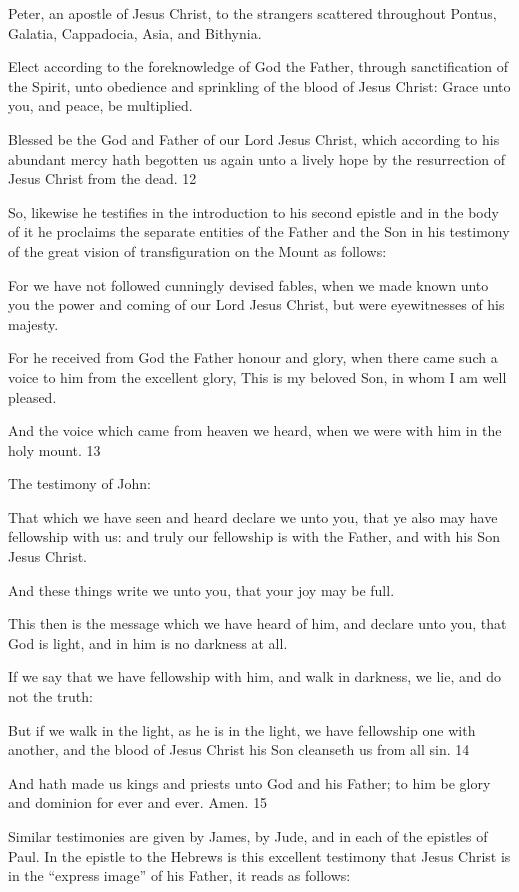 Peter, an apostle of Jesus Christ, to the strangers scattered throughout Pontus, Galatia,
Cappadocia, Asia, and Bithynia.

Elect according to the foreknowledge of God the Father, through sanctification of the Spirit,
unto obedience and sprinkling of the blood of Jesus Christ: Grace unto you, and peace, be
multiplied.

Blessed be the God and Father of our Lord Jesus Christ, which according to his abundant
mercy hath begotten us again unto a lively hope by the resurrection of Jesus Christ from the
dead. 12

So, likewise he testifies in the introduction to his second epistle and in the body of it he
proclaims the separate entities of the Father and the Son in his testimony of the great vision
of transfiguration on the Mount as follows:

For we have not followed cunningly devised fables, when we made known unto you the
power and coming of our Lord Jesus Christ, but were eyewitnesses of his majesty.

For he received from God the Father honour and glory, when there came such a voice to him
from the excellent glory, This is my beloved Son, in whom I am well pleased.

And the voice which came from heaven we heard, when we were with him in the holy
mount. 13

The testimony of John:

That which we have seen and heard declare we unto you, that ye also may have fellowship
with us: and truly our fellowship is with the Father, and with his Son Jesus Christ.

And these things write we unto you, that your joy may be full.

This then is the message which we have heard of him, and declare unto you, that God is light,
and in him is no darkness at all.

If we say that we have fellowship with him, and walk in darkness, we lie, and do not the
truth:

But if we walk in the light, as he is in the light, we have fellowship one with another, and the
blood of Jesus Christ his Son cleanseth us from all sin. 14

And hath made us kings and priests unto God and his Father; to him be glory and dominion
for ever and ever. Amen. 15

Similar testimonies are given by James, by Jude, and in each of the epistles of Paul. In the
epistle to the Hebrews is this excellent testimony that Jesus Christ is in the ``express image''
of his Father, it reads as follows:

